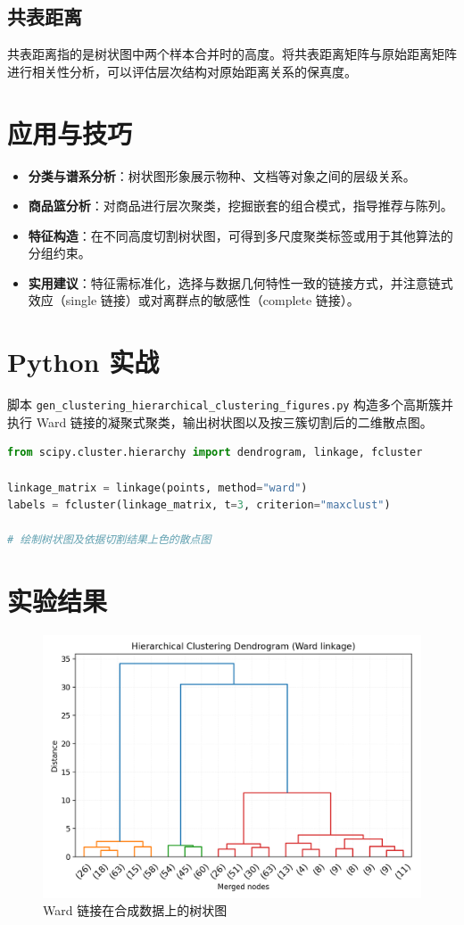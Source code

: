 \documentclass[UTF8,zihao=-4]{ctexart}
\begin{document}
\subsection{共表距离}
共表距离指的是树状图中两个样本合并时的高度。将共表距离矩阵与原始距离矩阵进行相关性分析，可以评估层次结构对原始距离关系的保真度。

\section{应用与技巧}
\begin{itemize}
  \item \textbf{分类与谱系分析}：树状图形象展示物种、文档等对象之间的层级关系。
  \item \textbf{商品篮分析}：对商品进行层次聚类，挖掘嵌套的组合模式，指导推荐与陈列。
  \item \textbf{特征构造}：在不同高度切割树状图，可得到多尺度聚类标签或用于其他算法的分组约束。
  \item \textbf{实用建议}：特征需标准化，选择与数据几何特性一致的链接方式，并注意链式效应（single 链接）或对离群点的敏感性（complete 链接）。
\end{itemize}

\section{Python 实战}
脚本 \texttt{gen\_clustering\_hierarchical\_clustering\_figures.py} 构造多个高斯簇并执行 Ward 链接的凝聚式聚类，输出树状图以及按三簇切割后的二维散点图。
\begin{lstlisting}[language=Python,caption={脚本 gen_clustering_hierarchical_clustering_figures.py 片段}]
from scipy.cluster.hierarchy import dendrogram, linkage, fcluster

linkage_matrix = linkage(points, method="ward")
labels = fcluster(linkage_matrix, t=3, criterion="maxclust")

# 绘制树状图及依据切割结果上色的散点图
\end{lstlisting}

\section{实验结果}
\begin{figure}[H]
  \centering
  \includegraphics[width=0.85\linewidth]{hierarchical_dendrogram.png}
  \caption{Ward 链接在合成数据上的树状图}
  \label{fig:hierarchical_dendrogram_cn}
\end{figure}
\end{document}
